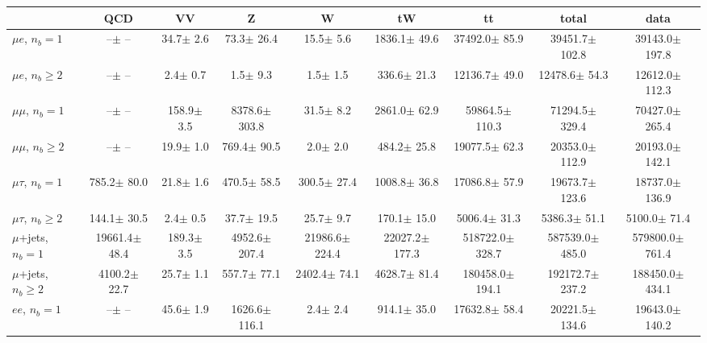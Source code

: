\begin{sidewaystable}[p]
    \centering
    \setlength{\tabcolsep}{0.4em}
    \renewcommand{\arraystretch}{2}
    \small
    \begin{tabular}{l|cccccc|cc}
    \hline
        & QCD & VV  & Z & W & tW & tt & total & data      \\
    \hline
    
    $\mu e$, $n_b=1$                   &       --$\pm$     -- &     34.7$\pm$    2.6 &     73.3$\pm$   26.4 &     15.5$\pm$    5.6 &   1836.1$\pm$   49.6 &  37492.0$\pm$   85.9 &  39451.7$\pm$  102.8 &  39143.0$\pm$  197.8 \\ 
    $\mu e$, $n_b\geq2$                &       --$\pm$     -- &      2.4$\pm$    0.7 &      1.5$\pm$    9.3 &      1.5$\pm$    1.5 &    336.6$\pm$   21.3 &  12136.7$\pm$   49.0 &  12478.6$\pm$   54.3 &  12612.0$\pm$  112.3 \\ 
    \hline
    $\mu\mu$, $n_b=1$                  &       --$\pm$     -- &    158.9$\pm$    3.5 &   8378.6$\pm$  303.8 &     31.5$\pm$    8.2 &   2861.0$\pm$   62.9 &  59864.5$\pm$  110.3 &  71294.5$\pm$  329.4 &  70427.0$\pm$  265.4 \\ 
    $\mu\mu$, $n_b\geq2$               &       --$\pm$     -- &     19.9$\pm$    1.0 &    769.4$\pm$   90.5 &      2.0$\pm$    2.0 &    484.2$\pm$   25.8 &  19077.5$\pm$   62.3 &  20353.0$\pm$  112.9 &  20193.0$\pm$  142.1 \\ 
    \hline
    $\mu\tau$, $n_b=1$                 &    785.2$\pm$   80.0 &     21.8$\pm$    1.6 &    470.5$\pm$   58.5 &    300.5$\pm$   27.4 &   1008.8$\pm$   36.8 &  17086.8$\pm$   57.9 &  19673.7$\pm$  123.6 &  18737.0$\pm$  136.9 \\ 
    $\mu\tau$, $n_b\geq2$              &    144.1$\pm$   30.5 &      2.4$\pm$    0.5 &     37.7$\pm$   19.5 &     25.7$\pm$    9.7 &    170.1$\pm$   15.0 &   5006.4$\pm$   31.3 &   5386.3$\pm$   51.1 &   5100.0$\pm$   71.4 \\ 
    \hline
    $\mu$+jets, $n_b=1$                &  19661.4$\pm$   48.4 &    189.3$\pm$    3.5 &   4952.6$\pm$  207.4 &  21986.6$\pm$  224.4 &  22027.2$\pm$  177.3 & 518722.0$\pm$  328.7 & 587539.0$\pm$  485.0 & 579800.0$\pm$  761.4 \\ 
    $\mu$+jets, $n_b\geq2$             &   4100.2$\pm$   22.7 &     25.7$\pm$    1.1 &    557.7$\pm$   77.1 &   2402.4$\pm$   74.1 &   4628.7$\pm$   81.4 & 180458.0$\pm$  194.1 & 192172.7$\pm$  237.2 & 188450.0$\pm$  434.1 \\ 
    \hline
    $e e$, $n_b=1$                     &       --$\pm$     -- &     45.6$\pm$    1.9 &   1626.6$\pm$  116.1 &      2.4$\pm$    2.4 &    914.1$\pm$   35.0 &  17632.8$\pm$   58.4 &  20221.5$\pm$  134.6 &  19643.0$\pm$  140.2 \\ 

\end{tabular}
\end{sidewaystable}
